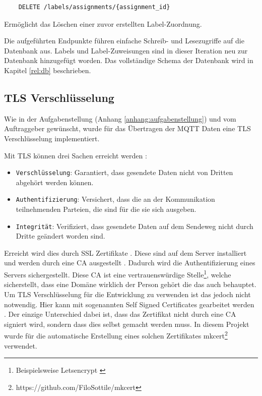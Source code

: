 \begin{verbatim}
    DELETE /labels/assignments/{assignment_id}
\end{verbatim}
Ermöglicht das Löschen einer zuvor erstellten Label-Zuordnung.

Die aufgeführten Endpunkte führen einfache Schreib- und Lesezugriffe auf die Datenbank aus.
Labels und Label-Zuweisungen sind in dieser Iteration neu zur Datenbank hinzugefügt worden.
Das vollständige Schema der Datenbank wird in Kapitel \ref{rel:db} beschrieben.


\subsection{\ac{TLS} Verschlüsselung}

Wie in der Aufgabenstellung (Anhang \ref{anhang:aufgabenstellung}) und vom Auftraggeber gewünscht, wurde
für das Übertragen der \ac{MQTT} Daten eine \ac{TLS} Verschlüsselung implementiert.

Mit \ac{TLS} können drei Sachen erreicht werden \parencite{what_is_tls}:

\begin{itemize}
    \item \texttt{Verschlüsselung}: Garantiert, dass gesendete Daten nicht von Dritten abgehört werden können.
    \item \texttt{Authentifizierung}: Versichert, dass die an der Kommunikation teilnehmenden Parteien, die sind für die sie sich ausgeben.
    \item \texttt{Integrität}: Verifiziert, dass gesendete Daten auf dem Sendeweg nicht durch Dritte geändert worden sind.
\end{itemize}

Erreicht wird dies durch SSL Zertifikate \parencite{what_is_ssl_certificate}. Diese sind auf dem Server
installiert und werden durch eine \ac{CA} ausgestellt \parencite{what_is_ca}.
Dadurch wird die Authentifizierung eines Servers sichergestellt.
Diese \ac{CA} ist eine vertrauenswürdige Stelle\footnote{
    Beispielsweise Letsencrypt \parencite{letsencrypt_2021}
}, welche sicherstellt, dass eine Domäne wirklich der Person gehört die das auch behauptet.
Um \ac{TLS} Verschlüsselung für die Entwicklung zu verwenden ist das jedoch nicht notwendig.
Hier kann mit sogenannten Self Signed Certificates gearbeitet werden \parencite{self_signed_cert}.
Der einzige Unterschied dabei ist, dass das Zertifikat nicht durch eine \ac{CA} signiert wird, sondern dass
dies selbst gemacht werden muss. In diesem Projekt wurde für die automatische Erstellung eines solchen
Zertifikates mkcert\footnote{https://github.com/FiloSottile/mkcert} verwendet.

